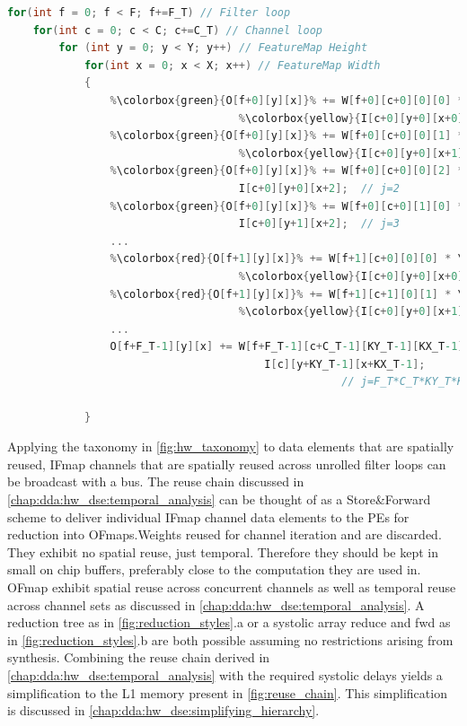 \clearpage
\begin{lstlisting}[language=C, caption=Spatial reuse in fully unrolled kernel loops, label={lst:conv_loops_unrolled_fully}]
for(int f = 0; f < F; f+=F_T) // Filter loop
    for(int c = 0; c < C; c+=C_T) // Channel loop
        for (int y = 0; y < Y; y++) // FeatureMap Height
            for(int x = 0; x < X; x++) // FeatureMap Width
            {
                %\colorbox{green}{O[f+0][y][x]}% += W[f+0][c+0][0][0] * \ 
                                    %\colorbox{yellow}{I[c+0][y+0][x+0]}%; // j=0
                %\colorbox{green}{O[f+0][y][x]}% += W[f+0][c+0][0][1] * \
                                    %\colorbox{yellow}{I[c+0][y+0][x+1]}%; // j=1
                %\colorbox{green}{O[f+0][y][x]}% += W[f+0][c+0][0][2] * \
                                    I[c+0][y+0][x+2];  // j=2
                %\colorbox{green}{O[f+0][y][x]}% += W[f+0][c+0][1][0] * \ 
                                    I[c+0][y+1][x+2];  // j=3
                ...
                %\colorbox{red}{O[f+1][y][x]}% += W[f+1][c+0][0][0] * \
                                    %\colorbox{yellow}{I[c+0][y+0][x+0]}%; // j=C_T*KY_T*KX_T
                %\colorbox{red}{O[f+1][y][x]}% += W[f+1][c+1][0][1] * \
                                    %\colorbox{yellow}{I[c+0][y+0][x+1]}%; // j=C_T*KY_T*KX_T+1
                ...
                O[f+F_T-1][y][x] += W[f+F_T-1][c+C_T-1][KY_T-1][KX_T-1] * \ 
                                        I[c][y+KY_T-1][x+KX_T-1]; 
                                                    // j=F_T*C_T*KY_T*KX_T-1
                                        
            }
\end{lstlisting}

Applying the taxonomy in \autoref{fig:hw_taxonomy} to data elements that are
spatially reused, IFmap channels that are spatially reused across unrolled
filter loops can be broadcast with a bus. The reuse chain discussed in
\autoref{chap:dda:hw_dse:temporal_analysis} can be thought of as a
Store\&Forward scheme to deliver individual IFmap channel data elements to the
\ac{PE}s for reduction into OFmaps.Weights reused for channel iteration and are
discarded. They exhibit no spatial reuse, just temporal. Therefore they should
be kept in small on chip buffers, preferably close to the computation they are
used in. OFmap exhibit spatial reuse across concurrent channels as well as
temporal reuse across channel sets as discussed in
\autoref{chap:dda:hw_dse:temporal_analysis}. A reduction tree as in
\autoref{fig:reduction_styles}.a or a systolic array reduce and fwd as in
\autoref{fig:reduction_styles}.b are both possible assuming no restrictions
arising from synthesis. Combining the reuse chain derived in
\autoref{chap:dda:hw_dse:temporal_analysis} with the required systolic
delays yields a simplification to the L1 memory present in
\autoref{fig:reuse_chain}. This simplification is discussed in
\autoref{chap:dda:hw_dse:simplifying_hierarchy}.


